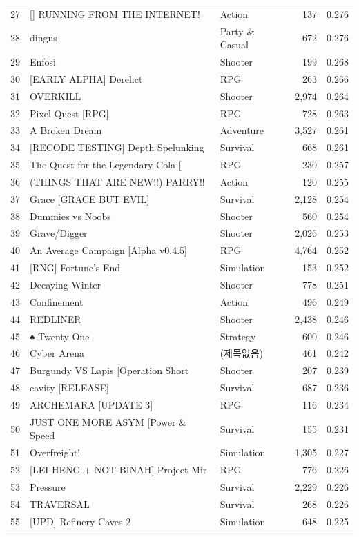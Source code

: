 \documentclass[10pt]{article}
\begin{document}
\begin{longtable}{r l l r r}
27 & [] RUNNING FROM THE INTERNET! & Action & 137 & 0.276 \\
28 & dingus & Party \& Casual & 672 & 0.276 \\
29 & Enfosi & Shooter & 199 & 0.268 \\
30 & [EARLY ALPHA] Derelict & RPG & 263 & 0.266 \\
31 & OVERKILL & Shooter & 2,974 & 0.264 \\
32 & Pixel Quest [RPG] & RPG & 728 & 0.263 \\
33 & A Broken Dream & Adventure & 3,527 & 0.261 \\
34 & [RECODE TESTING] Depth Spelunking & Survival & 668 & 0.261 \\
35 & The Quest for the Legendary Cola [ & RPG & 230 & 0.257 \\
36 & (THINGS THAT ARE NEW!!) PARRY!! & Action & 120 & 0.255 \\
37 & Grace [GRACE BUT EVIL] & Survival & 2,128 & 0.254 \\
38 & Dummies vs Noobs & Shooter & 560 & 0.254 \\
39 & Grave/Digger & Shooter & 2,026 & 0.253 \\
40 & An Average Campaign [Alpha v0.4.5] & RPG & 4,764 & 0.252 \\
41 & [RNG] Fortune's End & Simulation & 153 & 0.252 \\
42 & Decaying Winter & Shooter & 778 & 0.251 \\
43 & Confinement & Action & 496 & 0.249 \\
44 & REDLINER & Shooter & 2,438 & 0.246 \\
45 & ♠ Twenty One & Strategy & 600 & 0.246 \\
46 & Cyber Arena & (제목없음) & 461 & 0.242 \\
47 & Burgundy VS Lapis [Operation Short & Shooter & 207 & 0.239 \\
48 & cavity [RELEASE] & Survival & 687 & 0.236 \\
49 & ARCHEMARA [UPDATE 3] & RPG & 116 & 0.234 \\
50 & JUST ONE MORE ASYM [Power \& Speed & Survival & 155 & 0.231 \\
51 & Overfreight! & Simulation & 1,305 & 0.227 \\
52 & [LEI HENG + NOT BINAH] Project Mir & RPG & 776 & 0.226 \\
53 & Pressure & Survival & 2,229 & 0.226 \\
54 & TRAVERSAL & Survival & 268 & 0.226 \\
55 & [UPD] Refinery Caves 2 & Simulation & 648 & 0.225 \\

\end{longtable}
\end{document}
